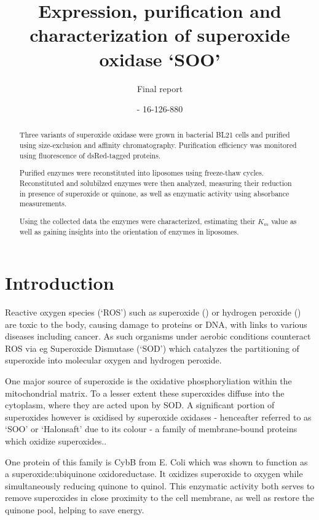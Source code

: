 \documentclass[a4paper,overfullrule=true]{scrartcl}
\title{Expression, purification and characterization of superoxide oxidase `SOO'}
\subtitle{Final report}
\author{\maillink{michael.senn@students.unibe.ch}{Michael Senn} - 16-126-880}
\date{\printdate}
\begin{document}
\maketitle

\begin{abstract}
	Three variants of superoxide oxidase were grown in bacterial BL21 cells
	and purified using size-exclusion and affinity chromatography.
	Purification efficiency was monitored using fluorescence of
	dsRed-tagged proteins.

	Purified enzymes were reconstituted into liposomes using freeze-thaw
	cycles. Reconstituted and solubilzed enzymes were then analyzed,
	measuring their reduction in presence of superoxide or quinone, as well
	as enzymatic activity using absorbance measurements.

	Using the collected data the enzymes were characterized, estimating
	their $K_m$ value as well as gaining insights into the orientation of
	enzymes in liposomes.
\end{abstract}

\newpage
\part*{Introduction}

Reactive oxygen species (`ROS') such as superoxide () or hydrogen
peroxide () are toxic to the body, causing damage to proteins or DNA,
with links to various diseases including cancer. As such organisms under
aerobic conditions counteract ROS via eg Superoxide Dismutase (`SOD') which
catalyzes the partitioning of superoxide into molecular oxygen and hydrogen
peroxide.

One major source of superoxide is the oxidative phosphoryliation within the
mitochondrial matrix. \cite{Novo2008} To a lesser extent these superoxides
diffuse into the cytoplasm, where they are acted upon by SOD. A significant
portion of superoxides however is oxidised by superoxide oxidases - henceafter
referred to as `SOO' or `Halonsaft' due to its colour - a family of
membrane-bound proteins which oxidize superoxides.\cite{superoxide_salvaging}.

One protein of this family is CybB from E. Coli which was shown to function as
a superoxide:ubiquinone oxidoreductase. It oxidizes superoxide to oxygen while
simultaneously reducing quinone to quinol.\cite{superoxide_salvaging} This
enzymatic activity both serves to remove superoxides in close proximity to the
cell membrane, as well as restore the quinone pool, helping to save energy.
\end{document}
